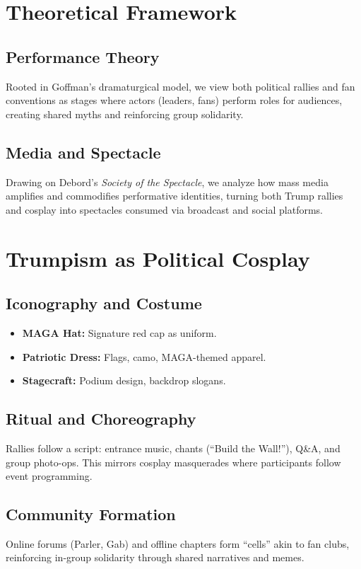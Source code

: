 \documentclass[11pt]{article}
\begin{document}
\section{Theoretical Framework}
\subsection{Performance Theory}
Rooted in Goffman’s dramaturgical model, we view both political rallies and fan conventions as stages where actors (leaders, fans) perform roles for audiences, creating shared myths and reinforcing group solidarity.

\subsection{Media and Spectacle}
Drawing on Debord’s \emph{Society of the Spectacle}, we analyze how mass media amplifies and commodifies performative identities, turning both Trump rallies and cosplay into spectacles consumed via broadcast and social platforms.

\clearpage
\section{Trumpism as Political Cosplay}
\subsection{Iconography and Costume}
\begin{itemize}
  \item \textbf{MAGA Hat:} Signature red cap as uniform.
  \item \textbf{Patriotic Dress:} Flags, camo, MAGA-themed apparel.
  \item \textbf{Stagecraft:} Podium design, backdrop slogans.
\end{itemize}

\subsection{Ritual and Choreography}
Rallies follow a script: entrance music, chants (“Build the Wall!”), Q\&A, and group photo-ops. This mirrors cosplay masquerades where participants follow event programming.

\subsection{Community Formation}
Online forums (Parler, Gab) and offline chapters form “cells” akin to fan clubs, reinforcing in-group solidarity through shared narratives and memes.
\end{document}

